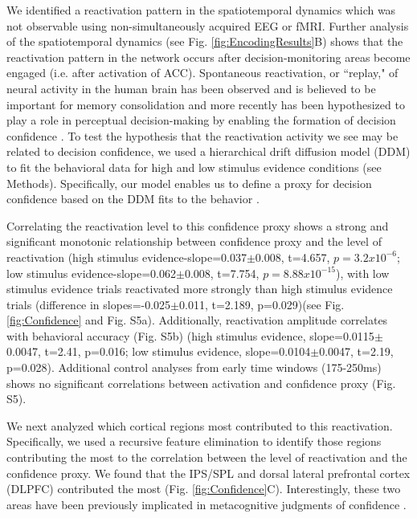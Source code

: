 We identified a reactivation pattern in the spatiotemporal dynamics which was not observable using non-simultaneously acquired EEG or fMRI. Further analysis of the spatiotemporal dynamics (see Fig. \ref{fig:EncodingResults}B) shows that the reactivation pattern in the network occurs after decision-monitoring areas become engaged (i.e. after activation of ACC). Spontaneous reactivation, or ``replay," of neural activity in the human brain has been observed and is believed to be important for memory consolidation \cite{Deuker2013} and more recently has been hypothesized to play a role in perceptual decision-making by enabling the formation of decision confidence \cite{Fleming2012}. To test the hypothesis that the reactivation activity we see may be related to decision confidence, we used a hierarchical drift diffusion model (DDM) \cite{Ratcliff2008,Wiecki2013} to fit the behavioral data for high and low stimulus evidence conditions (see Methods).  Specifically, our model enables us to define a proxy for decision confidence based on the DDM fits to the behavior \cite{Kiani2014,Philiastides2014}. 

Correlating the reactivation level to this confidence proxy shows a strong and significant monotonic relationship between confidence proxy and the level of reactivation (high stimulus evidence-slope=0.037$\pm$0.008, t=4.657, $p=3.2x10^{-6}$; low stimulus evidence-slope=0.062$\pm$0.008, t=7.754, $p=8.88x10^{-15}$), with low stimulus evidence trials reactivated more strongly than high stimulus evidence trials (difference in slopes=-0.025$\pm$0.011, t=2.189, p=0.029)(see Fig. \ref{fig:Confidence} and Fig. S5a). Additionally, reactivation amplitude correlates with behavioral accuracy (Fig. S5b) (high stimulus evidence, slope=0.0115$\pm$0.0047, t=2.41, p=0.016; low stimulus evidence, slope=0.0104$\pm$0.0047, t=2.19, p=0.028).  Additional control analyses from early time windows (175-250ms) shows no significant correlations between activation and confidence proxy (Fig. S5).

We next analyzed which cortical regions most contributed to this reactivation. Specifically, we used a recursive feature elimination to identify those regions contributing the most to the correlation between the level of reactivation and the confidence proxy.  We found that the IPS/SPL and dorsal lateral prefrontal cortex (DLPFC) contributed the most (Fig. \ref{fig:Confidence}C). Interestingly, these two areas have been previously implicated in metacognitive judgments of confidence \cite{Fleming2012,Steinhauser2010,Yeung2012}.

